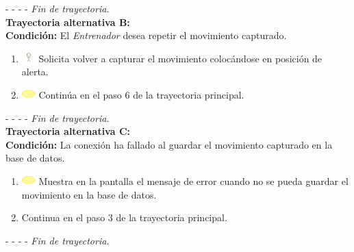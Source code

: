 - - - - \textit{Fin de trayectoria.} \\

\textbf{\large{Trayectoria alternativa B:}}\\
\textbf{Condición: } El \textit{Entrenador} desea repetir el movimiento capturado.

\begin{enumerate}
	\item \includegraphics[width=15pt, height=10pt]{./Figuras/iconosCU/usuario.png} Solicita volver a capturar el movimiento colocándose en posición de alerta.
	\item \includegraphics[width=15pt]{./Figuras/iconosCU/herramienta.png} Continúa en el paso 6 de la trayectoria principal.
\end{enumerate}

- - - - \textit{Fin de trayectoria.} \\

\textbf{\large{Trayectoria alternativa C:}}\\
\textbf{Condición: } La conexión ha fallado al guardar el movimiento capturado en la base de datos.

\begin{enumerate}
	\item \includegraphics[width=15pt]{./Figuras/iconosCU/herramienta.png} Muestra en la pantalla  el mensaje de error  cuando no se pueda guardar el movimiento en la base de datos.
	\item Continua en el paso 3 de la trayectoria principal.
\end{enumerate}

- - - - \textit{Fin de trayectoria.} \\

\clearpage